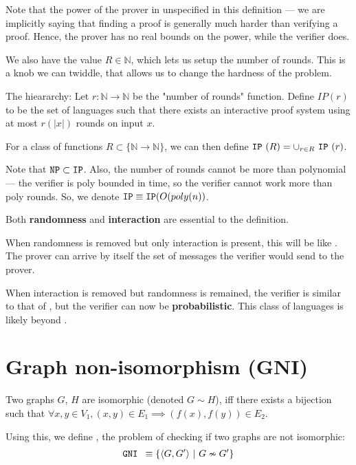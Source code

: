 Note that the power of the prover in unspecified in this definition ---
we are implicitly saying that finding a proof is generally much harder
than verifying a proof. Hence, the prover has no real bounds on the power,
while the verifier does.

We also have the value $R \in \mathbb{N}$, which lets us setup the number
of rounds. This is a knob we can twiddle, that allows us to change the hardness
of the problem.



\begin{definition}
The \ip hieararchy: Let $r: \mathbb{N} \to \mathbb{N}$ be the "number of rounds" function.
Define $IP(r)$ to be the set of languages such that there exists an interactive
proof system using at most $r(|x|)$ rounds on input $x$.

For a class of functions $R \subset \{ \mathbb{N} \to \mathbb{N} \}$, we can then define $\texttt{IP}~(R) = \cup_{r \in R} ~\texttt{IP}~(r)$.
\end{definition}


Note that $\texttt{NP} \subset \texttt{IP}$.  Also, the number of rounds cannot be more than 
polynomial --- the verifier is poly bounded in time, so the verifier
cannot work more than poly rounds.  So, we denote $\texttt{IP} \equiv \texttt{IP}(O(poly(n))$.

Both \textbf{randomness} and \textbf{interaction} are essential to the definition.


When randomness is removed but only interaction is present, this will be
like \nptime. The prover can arrive by itself the set of messages the
verifier would send to the prover.


When interaction is removed but randomness is remained, the verifier is
similar to that of \nptime, but the verifier can now be \textbf{probabilistic}.
This class of languages is likely beyond \nptime.

\section{Graph non-isomorphism (GNI)}
Two graphs $G$, $H$ are isomorphic (denoted $G \sim H$), iff there exists
a bijection such that $\forall x, y \in V_1, (x, y) \in E_1 \implies (f(x), f(y)) \in E_2$.

Using this, we define \gni, the problem of checking if two graphs
are not isomorphic:
\begin{align*}
\texttt{GNI } \equiv \{ \langle G, G' \rangle ~\vert~ G \nsim G' \}
\end{align*}

